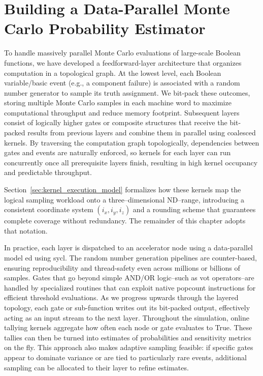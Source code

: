 \chapter{Building a Data-Parallel Monte Carlo Probability Estimator}
\label{chap:mc_solver}

To handle massively parallel Monte Carlo evaluations of large-scale Boolean functions, we have developed a feedforward-layer architecture that organizes computation in a topological graph. At the lowest level, each Boolean variable/basic event (e.g., a component failure) is associated with a random number generator to sample its truth assignment. We bit-pack these outcomes, storing multiple Monte Carlo samples in each machine word to maximize computational throughput and reduce memory footprint. Subsequent layers consist of logically higher gates or composite structures that receive the bit-packed results from previous layers and combine them in parallel using coalesced kernels. By traversing the computation graph topologically, dependencies between gates and events are naturally enforced, so kernels for each layer can run concurrently once all prerequisite layers finish, resulting in high kernel occupancy and predictable throughput.

Section~\ref{sec:kernel_execution_model} formalizes how these kernels map the logical sampling workload onto a three–dimensional ND–range, introducing a consistent coordinate system $(i_x,i_y,i_z)$ and a rounding scheme that guarantees complete coverage without redundancy.  The remainder of this chapter adopts that notation.

In practice, each layer is dispatched to an accelerator node using a data-parallel model ed using \acrshort{sycl}. The random number generation pipelines are counter-based, ensuring reproducibility and thread-safety even across millions or billions of samples. Gates that go beyond simple AND/OR logic--such as \acrshort{vot} operators--are handled by specialized routines that can exploit native popcount instructions for efficient threshold evaluations. As we progress upwards through the layered topology, each gate or sub-function writes out its bit-packed output, effectively acting as an input stream to the next layer.
Throughout the simulation, online tallying kernels aggregate how often each node or gate evaluates to True. These tallies can then be turned into estimates of probabilities and sensitivity metrics on the fly. This approach also makes adaptive sampling feasible: if specific gates appear to dominate variance or are tied to particularly rare events, additional sampling can be allocated to their layer to refine estimates.

